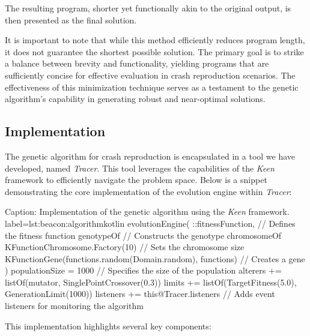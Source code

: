         The resulting program, shorter yet functionally akin to the original output, is then presented as the final 
        solution.
    
        It is important to note that while this method efficiently reduces program length, it does not guarantee the 
        shortest possible solution. The primary goal is to strike a balance between brevity and functionality, yielding 
        programs that are sufficiently concise for effective evaluation in crash reproduction scenarios. The 
        effectiveness of this minimization technique serves as a testament to the genetic algorithm's capability in 
        generating robust and near-optimal solutions.
    
    \subsection{Implementation}
        The genetic algorithm for crash reproduction is encapsulated in a tool we have developed, named \textit{Tracer}. 
        This tool leverages the capabilities of the \textit{Keen} framework to efficiently navigate the problem space. 
        Below is a snippet demonstrating the core implementation of the evolution engine within \textit{Tracer}:
    
        \begin{code}{%
            Caption: Implementation of the genetic algorithm using the \textit{Keen} framework.
        }{label=lst:beacon:algorithm}{kotlin}
            evolutionEngine(
                ::fitnessFunction, // Defines the fitness function
                genotypeOf { // Constructs the genotype
                    chromosomeOf {
                        KFunctionChromosome.Factory(10) { // Sets the chromosome size
                            KFunctionGene(functions.random(Domain.random), functions) // Creates a gene
                        }
                    }
                }
            ) {
                populationSize = 1000 // Specifies the size of the population
                alterers += listOf(mutator, SinglePointCrossover(0.3))
                limits += listOf(TargetFitness(5.0), GenerationLimit(1000))
                listeners += this@Tracer.listeners // Adds event listeners for monitoring the algorithm
            }
        \end{code}
    
        This implementation highlights several key components:

